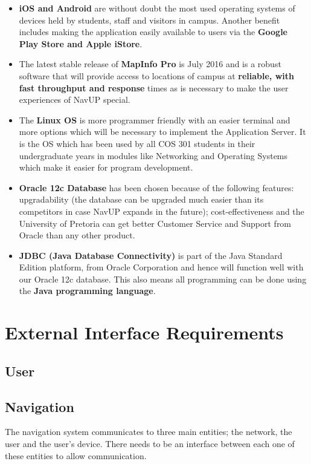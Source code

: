 \documentclass[runningheads,a4paper]{article}
\begin{document}
\begin {itemize} 
\item \textbf{iOS and Android} are without doubt the most used operating systems of devices held by students, staff and visitors in campus. Another benefit includes making the application easily available to users via the \textbf{Google Play Store and Apple iStore}.

\item The latest stable release of \textbf{MapInfo Pro} is July 2016 and is a robust software that will provide access to locations of campus at \textbf{reliable, with fast throughput and response} times as is necessary to make the user experiences of NavUP special.

\item The \textbf{Linux OS} is more programmer friendly with an easier terminal and more options which will be necessary to implement the Application Server. It is the OS which has been used by all COS 301 students in their undergraduate years in modules like Networking and Operating Systems which make it easier for program development.

\item \textbf{Oracle 12c Database} has been chosen because of the following features: upgradability (the database can be upgraded much easier than its competitors in case NavUP expands in the future); cost-effectiveness and the University of Pretoria can get better Customer Service and Support from Oracle than any other product.

\item \textbf{JDBC (Java Database Connectivity)} is part of the Java Standard Edition platform, from Oracle Corporation and hence will function well with our Oracle 12c database. This also means all programming can be done using the \textbf{Java programming language}.

\end{itemize}

\section{External Interface Requirements}

\subsection{User}

\subsection{Navigation}
The navigation system communicates to three main entities; the network, the user and the user’s device. There needs to be an interface between each one of these entities to allow communication.
\end{document}

